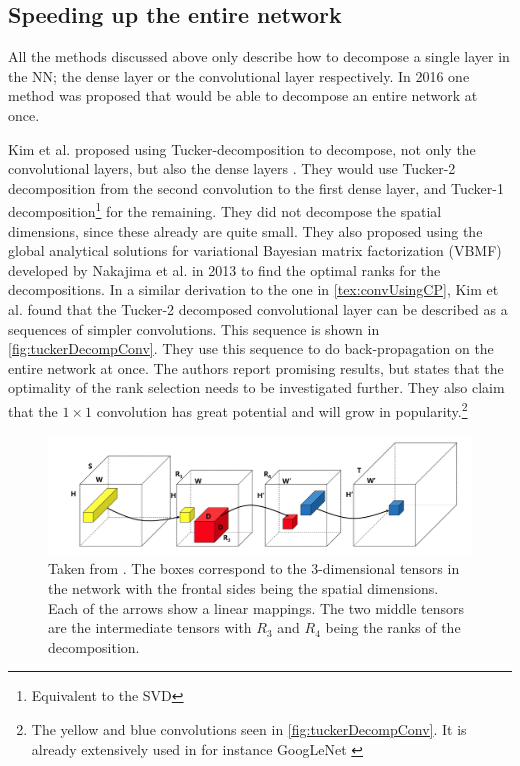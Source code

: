 \subsection{Speeding up the entire network}
All the methods discussed above only describe how to decompose a single layer in the NN; the dense layer or the convolutional layer respectively. In 2016 one method was proposed that would be able to decompose an entire network at once.

Kim et al. proposed using Tucker-decomposition to decompose, not only the convolutional layers, but also the dense layers \cite{Kim2016}. They would use Tucker-2 decomposition from the second convolution to the first dense layer, and Tucker-1 decomposition\footnote{Equivalent to the SVD} for the remaining. They did not decompose the spatial dimensions, since these already are quite small. They also proposed using the global analytical solutions for variational Bayesian matrix factorization (VBMF) developed by Nakajima et al. in 2013 \cite{Nakajima2013} to find the optimal ranks for the decompositions. In a similar derivation to the one in \autoref{tex:convUsingCP}, Kim et al. found that the Tucker-2 decomposed convolutional layer can be described as a sequences of simpler convolutions. This sequence is shown in \autoref{fig:tuckerDecompConv}. They use this sequence to do back-propagation on the entire network at once. The authors report promising results, but states that the optimality of the rank selection needs to be investigated further. They also claim that the $1\times 1$ convolution has great potential and will grow in popularity.\footnote{The yellow and blue convolutions seen in \autoref{fig:tuckerDecompConv}. It is already extensively used in for instance GoogLeNet \cite{Szegedy2015}}

\begin{figure}
    \centering
    \includegraphics[width=\linewidth]{Pics/03_Previous_work/tuckerDecomp.png}
    \caption{Taken from \cite{Kim2016}. The boxes correspond to the 3-dimensional tensors in the network with the frontal sides being the spatial dimensions. Each of the arrows show a linear mappings. The two middle tensors are the intermediate tensors with $R_3$ and $R_4$ being the ranks of the decomposition.}
    \label{fig:tuckerDecompConv}
\end{figure}

